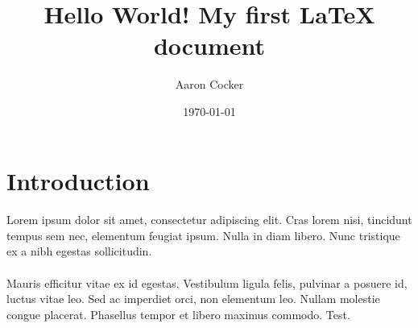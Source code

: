 \documentclass[a4paper,12pt]{article}
\begin{document}
\title{Hello World! My first LaTeX document}
\author{Aaron Cocker}
\date{\today}
\maketitle

\section{Introduction}

\paragraph{}
Lorem ipsum dolor sit amet, consectetur adipiscing elit. Cras lorem nisi, tincidunt tempus sem nec, elementum feugiat ipsum. Nulla in diam libero. Nunc tristique ex a nibh egestas sollicitudin.

\paragraph{}
Mauris efficitur vitae ex id egestas. Vestibulum ligula felis, pulvinar a posuere id, luctus vitae leo. Sed ac imperdiet orci, non elementum leo. Nullam molestie congue placerat. Phasellus tempor et libero maximus commodo. Test.
\end{document}
